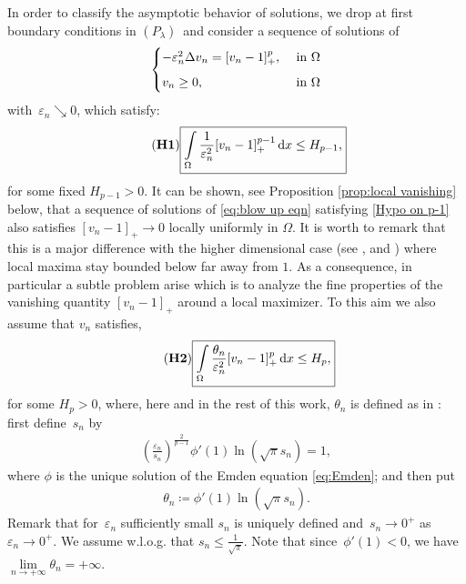 \documentclass[10pt]{amsart}
\newcommand{\parenthesis}[1]{\left(#1\right)} %
\newcommand{\dd}{\mathop{}\!\mathrm{d}}
\newcommand{\eps}{\varepsilon}
\renewcommand{\to}{\rightarrow}
\newcommand{\om}{\Omega}
\newcommand{\lm}{\lambda}
\newcommand{\prl}{{$(P_{\lm})$}}
\begin{document}
In order to classify the asymptotic behavior of solutions, we drop at first boundary conditions in \prl\, and
consider a sequence of solutions of
\begin{align}\label{eq:blow up eqn}
    \begin{cases}
        -\eps_n^2\Delta v_n= [v_n-1]_+^p, & \mbox{ in } \Omega\vspace{2mm}\\
        v_n\geq 0, & \mbox{ in } \Omega
    \end{cases}
\end{align}
with~$\eps_n\searrow 0$, which satisfy:
\begin{align}\label{Hypo on p-1} \tag{{\bf H1}}
    \boxed{\int\limits_\Omega \frac{1}{\eps_n^2}[v_n-1]_+^{p-1}\dd{x} \leq H_{p-1}, }
\end{align}
for some fixed $H_{p-1}>0$. It can be shown, see Proposition \ref{prop:local vanishing} below, that a sequence of solutions of \eqref{eq:blow up eqn}
satisfying \eqref{Hypo on p-1} also satisfies $[v_n-1]_+\to 0$ locally uniformly in $\om$. It is worth to remark that this
is a major difference with the higher dimensional case (see \cite{FW}, \cite{W} and \cite{BJW}) where local maxima stay bounded below far away from
$1$. As a consequence, in particular a subtle problem arise which is to analyze the fine properties of the vanishing quantity
$[v_n-1]_+$ around a local maximizer. To this aim we also assume that $v_n$ satisfies,
\begin{align}\label{Hypo on p} \tag{{\bf H2}}
\boxed{\int\limits_\Omega \frac{\theta_n}{\eps_n^2}[v_n-1]_+^{p}\dd{x} \leq H_p, }
\end{align}
for some $H_{p}>0$, where, here and in the rest of this work, $\theta_n$ is defined as in \cite{DY}: first define~$s_n$ by
\begin{align}\label{thetan1}
        \parenthesis{\frac{\eps_n}{s_n}}^{\frac{2}{p-1}} \phi'(1)\ln(\sqrt{\pi} s_n)=1,
    \end{align}
    where $\phi$ is the unique solution of the Emden equation \eqref{eq:Emden}; and then put
    \begin{align}\label{thetan2}
        \theta_n\coloneqq \phi'(1)\ln(\sqrt{\pi}s_n).
    \end{align}
    Remark that for~$\eps_n$ sufficiently small $s_n$ is uniquely defined and~$s_n\to 0^+$ as $\eps_n\to 0^+$.
    We assume w.l.o.g. that $s_n\leq \frac{1}{\sqrt{\pi}}$.
    Note that since~$\phi'(1)<0$, we have $\lim\limits_{n\to+\infty}\theta_n=+\infty$.
\end{document}
